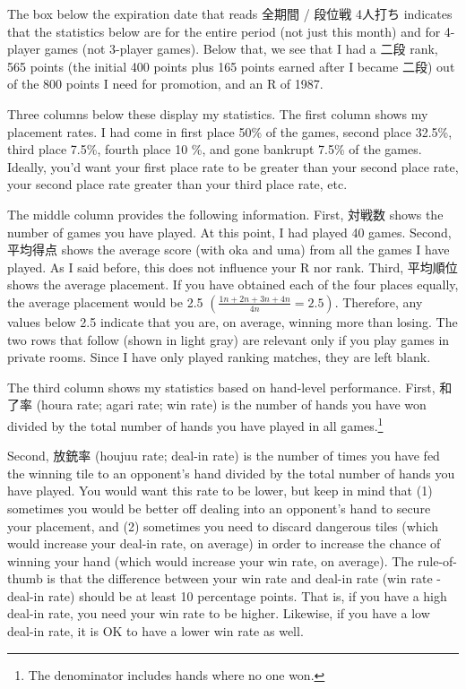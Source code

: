 \bigskip

The box below the expiration date that reads 全期間 / 段位戦 4人打ち indicates that the statistics below are for the entire period (not just this month) and for 4-player games (not 3-player games). Below that, we see that I had a 二段 rank, 565 points (the initial 400 points plus 165 points earned after I became 二段) out of the 800 points I need for promotion, and an R of 1987. 

\bigskip

Three columns below these display my statistics. The first column shows my placement rates. I had come in first place 50\% of the games, second place 32.5\%, third place 7.5\%, fourth place 10 \%, and gone bank\-rupt 7.5\% of the games. Ideally, you'd want your first place rate to be greater than your second place rate, your second place rate greater than your third place rate, etc. 

\bigskip

The middle column provides the following information. First, 対戦数 shows the number of games you have played. At this point, I had played 40 games. Second, 平均得点 shows the average score (with {\jap oka} and {\jap uma}) from all the games I have played. As I said before, this does not influence your R nor rank. Third, 平均順位 shows the average placement. If you have obtained each of the four places equally, the average placement would be 2.5 $\left( \frac{1  n + 2  n + 3  n + 4 n}{4n} = 2.5 \right)$. Therefore, any values below 2.5 indicate that you are, on average, winning more than losing. 
The two rows that follow (shown in light gray) are relevant only if you play games in private rooms. Since I have only played ranking matches, they are left blank. 

\bigskip

The third column shows my statistics based on hand-level performance. First, 和了率 ({\jap houra} rate; {\jap agari} rate; win rate) is the number of hands you have won divided by the total number of hands you have played in all games.\footnote{The denominator includes hands where no one won.} 

\bigskip
Second, 放銃率 ({\jap houjuu} rate; deal-in rate) is the number of times you have fed the winning tile to an opponent's hand divided by the total number of hands you have played. You would want this rate to be lower, but keep in mind that (1) sometimes you would be better off dealing into an opponent's hand to secure your placement, and (2) sometimes you need to discard dangerous tiles (which would increase your deal-in rate, on average) in order to increase the chance of winning your hand (which would increase your win rate, on average). The rule-of-thumb is that the difference between your win rate and deal-in rate (win rate - deal-in rate) should be at least 10 percentage points. That is, if you have a high deal-in rate, you need your win rate to be higher. Likewise, if you have a low deal-in rate, it is OK to have a lower win rate as well. 

